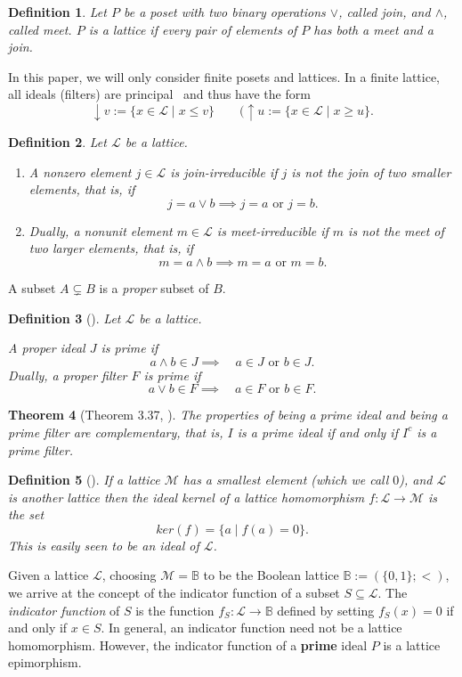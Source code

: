 \documentclass[10pt,letterpaper]{article}
\newcommand{\bbB}{\mathbb{B}}
\newcommand{\cL}{\mathcal{L}}
\newcommand{\cM}{\mathcal{M}}
\newtheorem{thm}{Theorem}[section]
\newtheorem{defn}[thm]{Definition}
\begin{document}
\begin{defn}\label{def:lattice}
Let $P$ be a poset with two binary operations $\vee$, called \textit{ join}, and $\wedge$, called \textit{meet}.
$P$ is a lattice if every pair of elements of $P$ has both a meet and a join.
\end{defn}
In this paper, we will only consider finite posets and lattices. In a finite lattice, all ideals (filters) are principal~\cite{roman_lattices_2008} and thus have the form 
\[ \downarrow v :=\{x \in \cL \;|\; x\leq v\} \qquad (\uparrow u :=\{x \in \cL \;|\; x\geq u\}. \]
 
\begin{defn}
    Let $\cL$ be a lattice.
\begin{enumerate}
\item A nonzero element $j \in \cL$ is \textit{ join-irreducible} if $j$ is not the join of two
smaller elements, that is, if
\[ j = a \vee b \implies j=a \mbox{ or } j=b .\]
\item Dually, a nonunit element $ m \in \cL$ is meet-irreducible if $m$ is not the meet
of two larger elements, that is, if
\[ m = a \wedge b \implies m=a \mbox{ or } m=b .\]
\end{enumerate}
\end{defn}

A subset $A\subsetneq B$ is a \textit{ proper } subset of $B$. 

\begin{defn}[\cite{roman_lattices_2008}] Let $\cL$ be a lattice.

A proper ideal $J$ is \textit{ prime } if
\[ a\wedge b \in J \implies \quad a\in J \mbox{ or } b \in J .\]
Dually, a proper filter $F$ is \textit{ prime } if
\[ a\vee b \in F \implies \quad a\in F \mbox{ or } b \in F.\]
\end{defn}

\begin{thm}[Theorem 3.37, \cite{roman_lattices_2008}]\label{duality}
The properties of being a prime ideal and being a prime filter are complementary, that is, $I$ is a prime ideal if and only if $I^c$ is a prime filter.
\end{thm}

\begin{defn}[\cite{roman_lattices_2008}]
    If a lattice $\cM$ has a smallest element (which we call $0$), and $\cL$ is another lattice then the \textit{ ideal kernel} of a lattice homomorphism $f:\cL \to \cM$ is the set
\[ ker(f) = \{ a \;|\; f(a)=0\}.\]
This is easily seen to be an ideal of $\cL$. 
\end{defn}
Given a lattice $\cL$, choosing $\cM= \bbB$ to be the Boolean lattice $\bbB:=(\{0,1\}; <)$, we arrive at the concept of the indicator function of a subset $S \subseteq \cL$. The \textit{indicator function} of $S$ is the function
$f_S:\cL \to \bbB$ defined by setting $f_S(x) = 0$ if and only if $x \in S$. 
In general, an indicator function need not be a lattice homomorphism. However, the indicator function of a \textbf{prime } ideal $P$ is a lattice epimorphism. 
\end{document}
